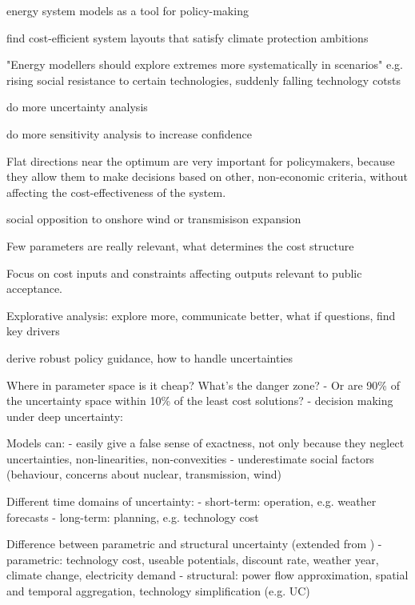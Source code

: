 

energy system models as a tool for policy-making

find cost-efficient system layouts that satisfy climate protection ambitions

"Energy modellers should explore extremes more systematically in scenarios" e.g. rising social resistance to certain technologies, suddenly falling technology cotsts \cite{mccollum_energy_2020,pye_modelling_2020}

do more uncertainty analysis \cite{yue_review_2018, pye_assessing_2018, Pfenninger2014,pye_modelling_2020,decarolis_leveraging_nodate} 

do more sensitivity analysis to increase confidence \cite{bistline_deepening_2020} 

Flat directions near the optimum are very important for policymakers,
because they allow them to make decisions based on other,
non-economic criteria, without affecting the cost-effectiveness of the system.

social opposition to onshore wind or transmisison expansion

Few parameters are really relevant, what determines the cost structure \cite{moret_characterization_2017} \cite{usher_value_2015}

Focus on cost inputs and constraints affecting outputs relevant to public acceptance.

Explorative analysis: explore more, communicate better, what if questions, find key drivers

derive robust policy guidance, how to handle uncertainties 

Where in parameter space is it cheap? What's the danger zone?
- Or are 90\% of the uncertainty space within 10\% of the least cost solutions?
- decision making under deep uncertainty:

Models can:
- easily give a false sense of exactness, not only because they neglect uncertainties, non-linearities, non-convexities
- underestimate social factors (behaviour, concerns about nuclear, transmission, wind)


Different time domains of uncertainty:
- short-term: operation, e.g. weather forecasts
- long-term: planning, e.g. technology cost

Difference between parametric and structural uncertainty (extended from \cite{DeCarolis2017})
- parametric: technology cost, useable potentials, discount rate, weather year, climate change, electricity demand
- structural: power flow approximation, spatial and temporal aggregation, technology simplification (e.g. UC)

